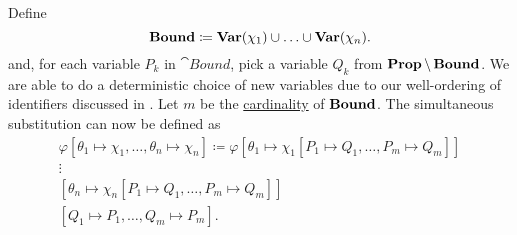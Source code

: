 \begin{definition}
\begin{thmenum}
    Define
    \begin{equation*}
      \operatorname{\mathbf{Bound}} \coloneqq \operatorname{\mathbf{Var}}(\chi_1) \cup \ldots \cup \operatorname{\mathbf{Var}}(\chi_n).
    \end{equation*}
    and, for each variable \( P_k \) in \( \cat{Bound} \), pick a variable \( Q_k \) from \( \operatorname{\mathbf{Prop}} \setminus \operatorname{\mathbf{Bound}} \). We are able to do a deterministic choice of new variables due to our well-ordering of identifiers discussed in . Let \( m \) be the \hyperref[def:cardinal]{cardinality} of \( \operatorname{\mathbf{Bound}} \). The simultaneous substitution can now be defined as
    \begin{align*}
      \varphi[\theta_1 \mapsto \chi_1, \ldots, \theta_n \mapsto \chi_n] \coloneqq \varphi
      [\theta_1 \mapsto \chi_1[P_1 \mapsto Q_1, \ldots, P_m \mapsto Q_m]] \\
      \vdots \hspace{3cm} \\
      [\theta_n \mapsto \chi_n[P_1 \mapsto Q_1, \ldots, P_m \mapsto Q_m]] \\
      [Q_1 \mapsto P_1, \ldots, Q_m \mapsto P_m].
    \end{align*}
  \end{thmenum}
\end{definition}

